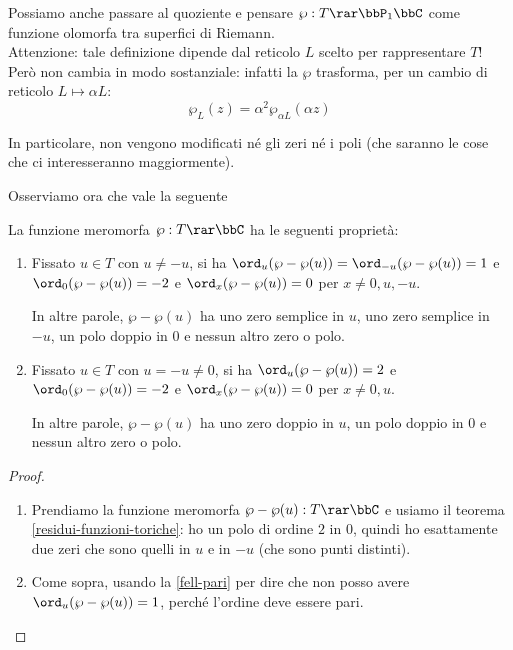 Possiamo anche passare al quoziente e pensare $\wp:T\rar\bbP_1\bbC$ come funzione olomorfa tra superfici di Riemann.\\
Attenzione: tale definizione dipende dal reticolo $L$ scelto per rappresentare $T$! Però non cambia in modo sostanziale: infatti la $\wp$ trasforma, per un cambio di reticolo $L \mapsto \alpha L$:
\[
 \wp_L(z) = \alpha^2 \wp_{\alpha L}(\alpha z)
\]

In particolare, non vengono modificati né gli zeri né i poli (che saranno le cose che ci interesseranno maggiormente).

Osserviamo ora che vale la seguente
\begin{proposizione}
La funzione meromorfa $\wp:T\rar\bbC$ ha le seguenti proprietà:

\begin{enumerate}[label=\roman*]
    \item Fissato $u\in T$ con $u\not=-u$, si ha $\ord_u(\wp-\wp(u))=\ord_{-u}(\wp-\wp(u))=1$ e $\ord_0(\wp-\wp(u))=-2$ e $\ord_x(\wp-\wp(u))=0$ per $x\not=0,u,-u$.

    In altre parole, $\wp-\wp(u)$ ha uno zero semplice in $u$, uno zero semplice in $-u$, un polo doppio in $0$ e nessun altro zero o polo.

    \item Fissato $u\in T$ con $u=-u\not=0$, si ha $\ord_u(\wp-\wp(u))=2$ e $\ord_0(\wp-\wp(u))=-2$ e $\ord_x(\wp-\wp(u))=0$ per $x\not=0,u$.

    In altre parole, $\wp-\wp(u)$ ha uno zero doppio in $u$, un polo doppio in $0$ e nessun altro zero o polo.
\end{enumerate}
\end{proposizione}

\begin{proof}$ $
\begin{enumerate}[label=\roman*]
    \item Prendiamo la funzione meromorfa $\wp-\wp(u):T\rar\bbC$ e usiamo il teorema \ref{residui-funzioni-toriche}: ho un polo di ordine $2$ in $0$, quindi ho esattamente due zeri che sono quelli in $u$ e in $-u$ (che sono punti distinti).

    \item Come sopra, usando la \ref{fell-pari} per dire che non posso avere $\ord_u(\wp-\wp(u))=1$, perché l'ordine deve essere pari.
\end{enumerate}

\end{proof}


